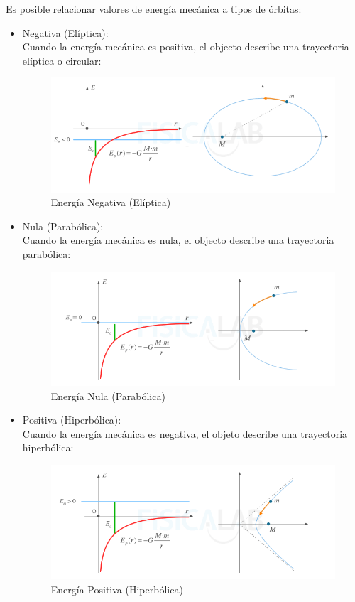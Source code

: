 \documentclass[arial,a4paper,print]{article}
\begin{document}
Es posible relacionar valores de energía mecánica a tipos de órbitas:
\begin{itemize}
	\item Negativa (Elíptica):\\
	Cuando la energía mecánica es positiva, el objecto describe una trayectoria elíptica o circular:
	\begin{figure}[h]
		\centering
		\includegraphics[width=0.6\linewidth]{figures/energia-mecanica-negativa}
		\caption{Energía Negativa (Elíptica)}
		\label{fig:energia-mecanica-positiva}
	\end{figure}

	\item Nula (Parabólica):\\
	Cuando la energía mecánica es nula, el objecto describe una trayectoria parabólica:
	\begin{figure}[h]
		\centering
		\includegraphics[width=0.6\linewidth]{figures/energia-mecanica-nula}
		\caption{Energía Nula (Parabólica)}
		\label{fig:energia-mecanica-nula}
	\end{figure}

\pagebreak
	\item Positiva (Hiperbólica):\\
	Cuando la energía mecánica es negativa, el objeto describe una trayectoria hiperbólica:
	\begin{figure}[h]
		\centering
		\includegraphics[width=0.6\linewidth]{figures/energia-mecanica-positiva}
		\caption{Energía Positiva (Hiperbólica)}
		\label{fig:energia-mecanica-negativa}
	\end{figure}
\end{itemize}
\end{document}
